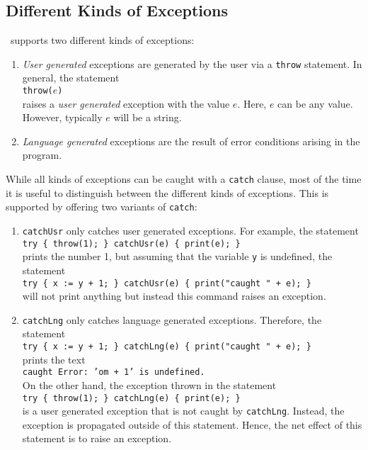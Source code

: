 \subsection{Different Kinds of Exceptions}
\setlx\ supports two different kinds of exceptions:
\begin{enumerate}
\item \emph{User generated} exceptions are generated by the user via a \texttt{throw} statement.
      In general, the statement
      \\[0.2cm]
      \hspace*{1.3cm}
      \texttt{throw($e$)}
      \\[0.2cm]
      raises a \emph{user generated} exception with the value $e$.  Here, $e$ can be any value.
      However, typically $e$ will be a string.
\item \emph{Language generated} exceptions are the result of error conditions arising in
      the program. 
\end{enumerate}
While all kinds of exceptions can be caught with a \texttt{catch} clause, most of the time
it is useful to distinguish between the different kinds of exceptions.  This is supported
by offering two variants of \texttt{catch}:
\begin{enumerate}
\item \texttt{catchUsr} only catches user generated exceptions.  For example, the statement
      \\[0.2cm]
      \hspace*{1.3cm}
      \texttt{try \{ throw(1); \} catchUsr(e) \{ print(e); \}}
      \\[0.2cm]
      prints the number 1, but assuming that the variable \texttt{y} is undefined, the 
      statement 
      \\[0.2cm]
      \hspace*{1.3cm}
      \texttt{try \{ x := y + 1; \} catchUsr(e) \{ print("caught " + e); \}}
      \\[0.2cm]
      will not print anything but instead this command raises an exception.
\item \texttt{catchLng} only catches language generated exceptions.  Therefore, the statement
      \\[0.2cm]
      \hspace*{1.3cm}
      \texttt{try \{ x := y + 1; \} catchLng(e) \{ print("caught " + e); \}}
      \\[0.2cm]
      prints the text
      \\[0.2cm]
      \hspace*{1.3cm}
      \texttt{caught Error: 'om + 1' is undefined.}
      \\[0.2cm]
      On the other hand,  the exception thrown in the statement
      \\[0.2cm]
      \hspace*{1.3cm}
      \texttt{try \{ throw(1); \} catchLng(e) \{ print(e); \}}
      \\[0.2cm]
      is a user generated exception that is not caught by \texttt{catchLng}.  Instead, the exception
      is propagated outside of this statement.  Hence, the net effect of this statement is to raise
      an exception.
\end{enumerate}

